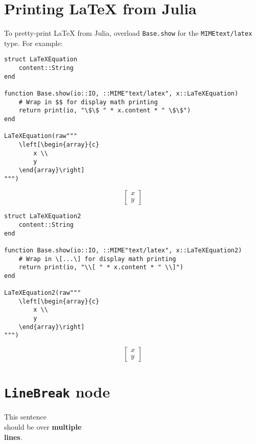 \section{Printing LaTeX from Julia}



\label{10914504187442884412}{}


To pretty-print LaTeX from Julia, overload \texttt{Base.show} for the \texttt{MIME{\textquotedbl}text/latex{\textquotedbl}} type. For example:




\begin{verbatim}
struct LaTeXEquation
    content::String
end

function Base.show(io::IO, ::MIME"text/latex", x::LaTeXEquation)
    # Wrap in $$ for display math printing
    return print(io, "\$\$ " * x.content * " \$\$")
end

LaTeXEquation(raw"""
    \left[\begin{array}{c}
        x \\
        y
    \end{array}\right]
""")
\end{verbatim}

$$     \left[\begin{array}{c}
        x \\
        y
    \end{array}\right]
 $$


\begin{verbatim}
struct LaTeXEquation2
    content::String
end

function Base.show(io::IO, ::MIME"text/latex", x::LaTeXEquation2)
    # Wrap in \[...\] for display math printing
    return print(io, "\\[ " * x.content * " \\]")
end

LaTeXEquation2(raw"""
    \left[\begin{array}{c}
        x \\
        y
    \end{array}\right]
""")
\end{verbatim}

\[     \left[\begin{array}{c}
        x \\
        y
    \end{array}\right]
 \]

\section{\texttt{LineBreak} node}



\label{18112929726868774212}{}


This sentence\\
should be over \textbf{multiple\\
lines}.




